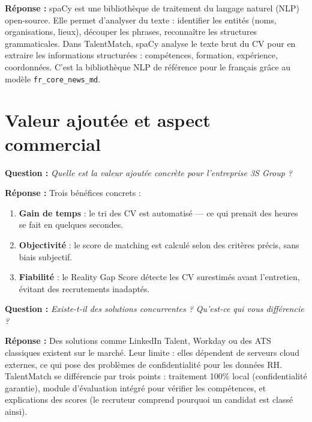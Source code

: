 \documentclass[12pt,a4paper]{article}
\newenvironment{jury}{%
  \def\FrameCommand{\fboxsep=8pt\colorbox{orange!12}}%
  \MakeFramed{\advance\hsize-\width \FrameRestore}%
  \vspace{-4pt}%
}{\endMakeFramed}
\newenvironment{reponse}{%
  \def\FrameCommand{\fboxsep=8pt\colorbox{green!10}}%
  \MakeFramed{\advance\hsize-\width \FrameRestore}%
  \vspace{-4pt}%
}{\endMakeFramed}
\newcommand{\Q}[1]{\vspace{6pt}\noindent\textbf{\color{orange}Question :} \textit{#1}}
\newcommand{\R}[1]{\noindent\textbf{\color{vert}Réponse :} #1\vspace{6pt}}
\begin{document}
\begin{reponse}
\R{spaCy est une bibliothèque de traitement du langage naturel (NLP) open-source.
Elle permet d'analyser du texte : identifier les entités (noms, organisations, lieux), découper les phrases, reconnaître les structures grammaticales.
Dans TalentMatch, spaCy analyse le texte brut du CV pour en extraire les informations structurées : compétences, formation, expérience, coordonnées.
C'est la bibliothèque NLP de référence pour le français grâce au modèle \texttt{fr\_core\_news\_md}.}
\end{reponse}

\section{Valeur ajoutée et aspect commercial}

\begin{jury}
\Q{Quelle est la valeur ajoutée concrète pour l'entreprise 3S Group ?}
\end{jury}

\begin{reponse}
\R{Trois bénéfices concrets :
\begin{enumerate}[leftmargin=1.5cm]
  \item \textbf{Gain de temps} : le tri des CV est automatisé — ce qui prenait des heures se fait en quelques secondes.
  \item \textbf{Objectivité} : le score de matching est calculé selon des critères précis, sans biais subjectif.
  \item \textbf{Fiabilité} : le Reality Gap Score détecte les CV surestimés avant l'entretien, évitant des recrutements inadaptés.
\end{enumerate}}
\end{reponse}

\begin{jury}
\Q{Existe-t-il des solutions concurrentes ? Qu'est-ce qui vous différencie ?}
\end{jury}

\begin{reponse}
\R{Des solutions comme LinkedIn Talent, Workday ou des ATS classiques existent sur le marché.
Leur limite : elles dépendent de serveurs cloud externes, ce qui pose des problèmes de confidentialité pour les données RH.
TalentMatch se différencie par trois points : traitement 100\% local (confidentialité garantie), module d'évaluation intégré pour vérifier les compétences, et explications des scores (le recruteur comprend pourquoi un candidat est classé ainsi).}
\end{reponse}
\end{document}
